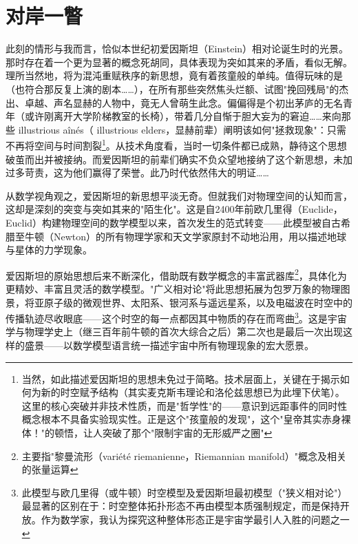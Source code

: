 \section{对岸一瞥}

此刻的情形与我而言，恰似本世纪初爱因斯坦（Einstein）相对论诞生时的光景。那时存在着一个更为显著的概念死胡同，具体表现为突如其来的矛盾，看似无解。理所当然地，将为混沌重赋秩序的新思想，竟有着孩童般的单纯。值得玩味的是（也符合那反复上演的剧本……），在所有那些突然焦头烂额、试图"挽回残局"的杰出、卓越、声名显赫的人物中，竟无人曾萌生此念。偏偏得是个初出茅庐的无名青年（或许刚离开大学阶梯教室的长椅），带着几分自惭于胆大妄为的窘迫……来向那些 illustrious aînés（ illustrious elders，显赫前辈）阐明该如何"拯救现象"：只需不再将空间与时间割裂\footnote{当然，如此描述爱因斯坦的思想未免过于简略。技术层面上，关键在于揭示如何为新的时空赋予结构（其实麦克斯韦理论和洛伦兹思想已为此埋下伏笔）。这里的核心突破并非技术性质，而是"哲学性"的——意识到远距事件的同时性概念根本不具备实验现实性。正是这个"孩童般的发现"，这个"皇帝其实赤身裸体！"的顿悟，让人突破了那个"限制宇宙的无形威严之圈"}。从技术角度看，当时一切条件都已成熟，静待这个思想破茧而出并被接纳。而爱因斯坦的前辈们确实不负众望地接纳了这个新思想，未加过多苛责，这为他们赢得了荣誉。此乃时代依然伟大的明证……

从数学视角观之，爱因斯坦的新思想平淡无奇。但就我们对物理空间的认知而言，这却是深刻的突变与突如其来的"陌生化"。这是自2400年前欧几里得（Euclide，Euclid）构建物理空间的数学模型以来，首次发生的范式转变——此模型被自古希腊至牛顿（Newton）的所有物理学家和天文学家原封不动地沿用，用以描述地球与星体的力学现象。

爱因斯坦的原始思想后来不断深化，借助既有数学概念的丰富武器库\footnote{主要指"黎曼流形（variété riemanienne，Riemannian manifold）"概念及相关的张量运算}，具体化为更精妙、丰富且灵活的数学模型。"广义相对论"将此思想拓展为包罗万象的物理图景，将亚原子级的微观世界、太阳系、银河系与遥远星系，以及电磁波在时空中的传播轨迹尽收眼底——这个时空的每一点都因其中物质的存在而弯曲\footnote{此模型与欧几里得（或牛顿）时空模型及爱因斯坦最初模型（"狭义相对论"）最显著的区别在于：时空整体拓扑形态不再由模型本质强制规定，而是保持开放。作为数学家，我认为探究这种整体形态正是宇宙学最引人入胜的问题之一}。这是宇宙学与物理学史上（继三百年前牛顿的首次大综合之后）第二次也是最后一次出现这样的盛景——以数学模型语言统一描述宇宙中所有物理现象的宏大愿景。

